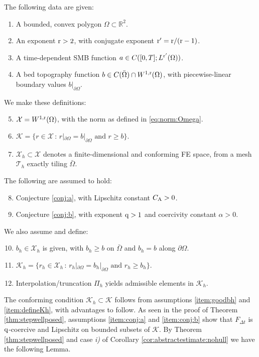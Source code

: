 \documentclass[hidelinks,onefignum,onetabnum,final]{siamart220329}  %
\newcommand{\RR}{\mathbb{R}}
\newcommand{\cK}{\mathcal{K}}
\newcommand{\cT}{\mathcal{T}}
\newcommand{\cX}{\mathcal{X}}
\newcommand{\qq}{{\text{\textnormal{q}}}}
\newcommand{\rr}{{\text{\textnormal{r}}}}
\newcommand{\CA}{C_\text{\textnormal{A}}}
\begin{document}
\smallskip
\begin{assumptions}
The following data are given:
\begin{enumerate}
\item A bounded, convex polygon $\Omega\subset\RR^2$.
\item An exponent $\rr > 2$, with conjugate exponent $\rr' = \rr/(\rr-1)$. \label{item:rr}
\item A time-dependent SMB function $a\in C([0,T]; L^{\rr'}(\Omega))$.
\item A bed topography function $b \in C(\bar\Omega) \cap W^{1,\rr}(\Omega)$, with piecewise-linear boundary values $b|_{\partial\Omega}$.
\end{enumerate}
We make these definitions:
\begin{enumerate}
\setcounter{enumi}{4}
\item $\cX = W^{1,\rr}(\Omega)$, with the norm as defined in \eqref{eq:norm:Omega}.
\item $\cK = \{r\in\cX\,:\,r|_{\partial \Omega} = b|_{\partial \Omega} \text{ and } r \ge b\}$.
\item $\cX_h \subset \cX$ denotes a finite-dimensional and conforming FE space, from a mesh $\cT_h$ exactly tiling $\bar\Omega$.
\end{enumerate}
The following are assumed to hold:
\begin{enumerate}
\setcounter{enumi}{7}
\item Conjecture \ref{conj:a}, with Lipschitz constant $\CA > 0$. \label{item:conj:a}
\item Conjecture \ref{conj:b}, with exponent $\qq>1$ and coercivity constant $\alpha > 0$.\label{item:conj:b}
\end{enumerate}
We also assume and define:
\begin{enumerate}
\setcounter{enumi}{9}
\item $b_h\in\cX_h$ is given, with $b_h\ge b$ on $\bar\Omega$ and $b_h=b$ along $\partial \Omega$. \label{item:goodbh}
\item $\cK_h = \{r_h\in\cX_h\,:\,r_h|_{\partial \Omega} = b_h|_{\partial \Omega} \text{ and } r_h \ge b_h\}$. \label{item:defineKh}
\item Interpolation/truncation $\Pi_h$ yields admissible elements in $\cK_h$.  \label{item:Pi}
\end{enumerate}
\end{assumptions}

\medskip
The conforming condition $\cK_h\subset \cK$ follows from assumptions \ref{item:goodbh} and \ref{item:defineKh}, with advantages to follow.  As seen in the proof of Theorem \ref{thm:stepwellposed}, assumptions \ref{item:conj:a} and \ref{item:conj:b} show that $F_{\Delta t}$ is $\qq$-coercive and Lipschitz on bounded subsets of $\cK$.  By Theorem \ref{thm:stepwellposed} and case \emph{i)} of Corollary \ref{cor:abstractestimate:nohull} we have the following Lemma.
\end{document}
